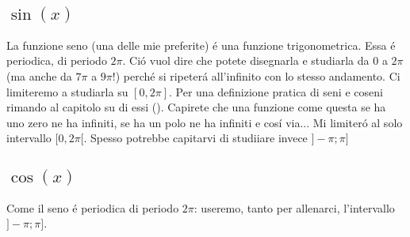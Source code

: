 \subsection{$\sin(x)$}

La funzione seno (una delle mie preferite) \'e una funzione trigonometrica. Essa \'e periodica, di periodo $2\pi$. Ci\'o
vuol dire che potete disegnarla e studiarla da $0$ a $2\pi$ (ma anche da $7\pi$ a $9\pi$!) perch\'e si ripeter\'a all'infinito con lo stesso
andamento. Ci limiteremo a studiarla su $[0,2\pi]$. Per una definizione pratica di seni e coseni rimando al capitolo su di essi
(). Capirete che una funzione come questa se ha uno zero ne ha infiniti, se ha un polo ne ha infiniti e cos\'i
via... Mi limiter\'o al solo intervallo $[0,2\pi[$. Spesso potrebbe capitarvi di studiiare invece $]-\pi;\pi]$

\begin{schedaf}
\end{schedaf}

\subsection{$\cos(x)$}
Come il seno \'e periodica di periodo $2\pi$: useremo, tanto per allenarci, l'intervallo $]-\pi;\pi]$.
\begin{schedaf}
\end{schedaf}

